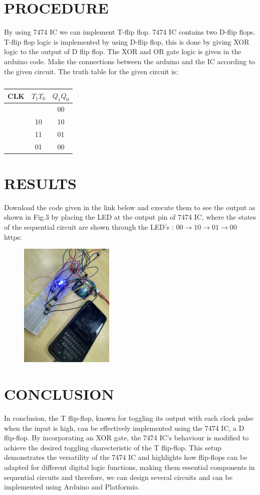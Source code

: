 \documentclass[conference]{IEEEtran}
\begin{document}
\section{PROCEDURE}
By using 7474 IC we can implement T-flip flop. 7474 IC contains two D-flip flops. T-flip flop logic is implemented by using D-flip flop, this is done by giving XOR logic to the output of D flip flop. The XOR and OR gate logic is given in the arduino code. Make the connections between the arduino and the IC according to the given circuit. The truth table for the given circuit is:
 \begin{table}[htbp]
	 \centering
	 \begin{tabular}{| c | c | c |}\hline
		 CLK & $T_{1}T_{0}$ & $Q_{1}Q_{0}$\\
		 \hline
		  & & 00\\ \hline
		  & 10 & 10\\ \hline
		  & 11 & 01\\ \hline
		  & 01 & 00\\
		  \hline
	 \end{tabular}
	 \vspace{0.1cm}
	 \caption{\label{tab:widgets}}
 \end{table}
\section{RESULTS}
Download the code given in the link below and execute them to see the output as shown in Fig.3 by placing the LED at the output pin of 7474 IC, where the states of the sequential circuit are shown through the LED's : $00\rightarrow10\rightarrow01\rightarrow00$
https:
\begin{figure}[h] 
	\centering 
	\includegraphics[width=0.4\textwidth]{img11.jpg}
	\caption{\label{fig:Result}}    
\end{figure}
\section{CONCLUSION}
In conclusion, the T flip-flop, known for toggling its output with each clock pulse when the input is high, can be effectively implemented using the 7474 IC, a D flip-flop. By incorporating an XOR gate, the 7474 IC's behaviour is modified to achieve the desired toggling charecteristic of the T flip-flop. This setup demonstrates the versatility of the 7474 IC and highlights how flip-flops can be adapted for different digital logic functions, making them essential components in sequential circuits and therefore, we can design several circuits and can be implemented using Arduino and Platformio.
\end{document}
